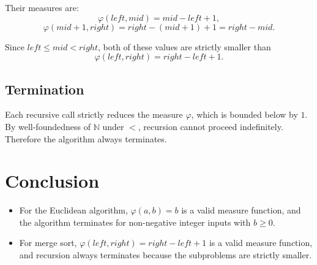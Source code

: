 \documentclass{article}
\theoremstyle{plain}
\theoremstyle{definition}
\theoremstyle{remark}
\begin{document}
Their measures are:
\[
    \varphi(left, mid) = mid - left + 1,
\]
\[
    \varphi(mid+1, right) = right - (mid+1) + 1 = right - mid.
\]

Since $left \leq mid < right$, both of these values are strictly smaller than
\[
    \varphi(left, right) = right - left + 1.
\]

\subsection{Termination}
Each recursive call strictly reduces the measure $\varphi$, which is bounded below by $1$. By well-foundedness of $\mathbb{N}$ under $<$, recursion cannot proceed indefinitely. Therefore the algorithm always terminates.

\section{Conclusion}

\begin{itemize}
    \item For the Euclidean algorithm, $\varphi(a,b)=b$ is a valid measure function, and the algorithm terminates for non-negative integer inputs with $b \geq 0$.
    \item For merge sort, $\varphi(left,right) = right - left + 1$ is a valid measure function, and recursion always terminates because the subproblems are strictly smaller.
\end{itemize}
\end{document}
